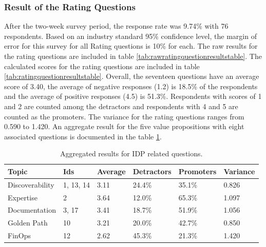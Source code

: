 \documentclass[a4paper,12pt]{article}
\begin{document}
    \subsubsection{Result of the Rating Questions}
    \label{sssec:rratque}
    After the two-week survey period, the response rate was 9.74\% with 76 respondents.
    Based on an industry standard 95\% confidence level\parencite{nistmean}, the margin of error for this survey for all
    Rating questions is 10\% for each.
    The raw results for the rating questions are included in table \ref{tab:rawratingquestionresultstable}.
    The calculated scores for the rating questions are included in table \ref{tab:ratingquestionresultstable}.
    Overall, the seventeen questions have an average score of 3.40, the average of negative responses (1.2) is 18.5\% of the
    respondents and the average of positive responses (4.5) is 51.3\%.
    Respondents with scores of 1 and 2 are counted among the detractors and respondents with 4 and 5 are counted as the promoters.
    The variance for the rating questions ranges from 0.590 to 1.420.
    An aggregate result for the five value propositions with eight associated questions is documented in the table \ref{tab:aggregateidpresults}.\\

    \begin{table}[!htbp]
        \begin{center}
            \begin{tabularx}{\textwidth}{llllll}
                \toprule
                Topic           & Ids       & Average & Detractors & Promoters & Variance \\
                \midrule
                Discoverability & 1, 13, 14 & 3.11    & 24.4\%     & 35.1\%    & 0.826    \\
                Expertise       & 2         & 3.64    & 12.0\%     & 65.3\%    & 1.097    \\
                Documentation   & 3, 17     & 3.41    & 18.7\%     & 51.9\%    & 1.056    \\
                Golden Path     & 10        & 3.21    & 20.0\%     & 42.7\%    & 0.850    \\
                FinOps          & 12        & 2.62    & 45.3\%     & 21.3\%    & 1.420    \\
                \bottomrule
            \end{tabularx}
        \end{center}
        \caption{\label{tab:aggregateidpresults} Aggregated results for IDP related questions.}
    \end{table}
    \FloatBarrier
\end{document}
